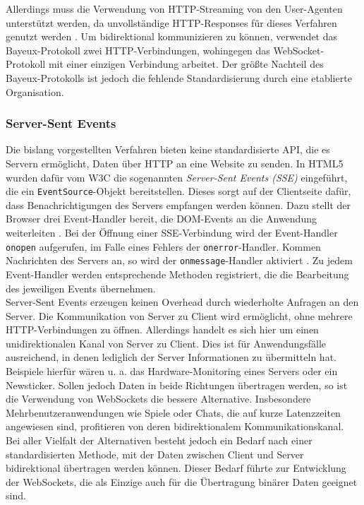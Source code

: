 \documentclass[11pt,a4paper,titlepage]{scrartcl}
\numberwithin{equation}{section}
\begin{document}
\noindent Allerdings muss die Verwendung von HTTP-Streaming von den User-Agenten unterstützt werden, da unvollständige HTTP-Responses für dieses Verfahren genutzt werden \autocite{russell_cometd_2007}. Um bidirektional kommunizieren zu können, verwendet das Bayeux-Protokoll zwei HTTP-Verbindungen, wohingegen das WebSocket-Protokoll mit einer einzigen Verbindung arbeitet. Der größte Nachteil des Bayeux-Protokolls ist jedoch die fehlende Standardisierung durch eine etablierte Organisation. 

\subsubsection{Server-Sent Events}\label{subsubsec:Server-SentEvents}
Die bislang vorgestellten Verfahren bieten keine standardisierte API, die es Servern ermöglicht, Daten über HTTP an eine Website zu senden. In HTML5 wurden dafür vom W3C die sogenannten \textit{Server-Sent Events (SSE)} eingeführt, die ein \texttt{EventSource}-Objekt bereitstellen. Dieses sorgt auf der Clientseite dafür, dass Benachrichtigungen des Servers empfangen werden können. Dazu stellt der Browser drei Event-Handler bereit, die DOM-Events an die Anwendung weiterleiten \autocite[31]{gorski_websockets_2015}. Bei der Öffnung einer SSE-Verbindung wird der Event-Handler \texttt{onopen} aufgerufen, im Falle eines Fehlers der \texttt{onerror}-Handler. Kommen Nachrichten des Servers an, so wird der \texttt{onmessage}-Handler aktiviert \autocite{hickson_server-sent_2009}. Zu jedem Event-Handler werden entsprechende Methoden registriert, die die Bearbeitung des jeweiligen Events übernehmen.\\

\noindent Server-Sent Events erzeugen keinen Overhead durch wiederholte Anfragen an den Server. Die Kommunikation von Server zu Client wird ermöglicht, ohne mehrere HTTP-Verbindungen zu öffnen. Allerdings handelt es sich hier um einen unidirektionalen Kanal von Server zu Client. Dies ist für Anwendungsfälle ausreichend, in denen lediglich der Server Informationen zu übermitteln hat. Beispiele hierfür wären u. a. das Hardware-Monitoring eines Servers oder ein Newsticker. Sollen jedoch Daten in beide Richtungen übertragen werden, so ist die Verwendung von WebSockets die bessere Alternative. Insbesondere Mehrbenutzeranwendungen wie Spiele oder Chats, die auf kurze Latenzzeiten angewiesen sind, profitieren von deren bidirektionalem Kommunikationskanal. \\

\noindent Bei aller Vielfalt der Alternativen besteht jedoch ein Bedarf nach einer standardisierten Methode, mit der Daten zwischen Client und Server bidirektional übertragen werden können. Dieser Bedarf führte zur Entwicklung der WebSockets, die als Einzige auch für die Übertragung binärer Daten geeignet sind.
\newpage
\end{document}
